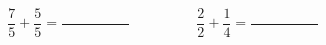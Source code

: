 
\question \[ \frac{7}{5} + \frac{5}{5} = \frac{\hspace{2cm}}{\hspace{2cm}} 
             \hspace{2cm}
             \frac{2}{2} + \frac{1}{4} = \frac{\hspace{2cm}}{\hspace{2cm}}
          \]
